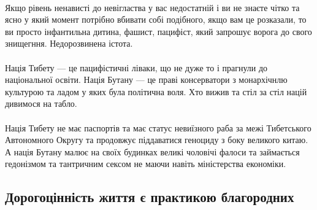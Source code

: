 \\
Якщо рівень ненависті до невігластва у вас недостатній і ви не знаєте чітко та ясно
у який момент потрібно вбивати собі подібного, якщо вам це розказали, то ви просто
інфантильна дитина, фашист, пацифіст, який запрошує ворога до свого знищегння. Недорозвинена істота.
\\
\\
Нація Тибету --- це пацифістичні ліваки, що не дуже то і прагнули до національної освіти.
Нація Бутану --- це праві консерватори з монархічнлю культурою та ладом у яких була політична воля.
Хто вижив та стіл за стіл націй дивимося на табло.
\\
\\
Нація Тибету не має паспортів та має статус невиїзного раба за межі Тибетського Автономного Округу та
продовжує піддаватися геноциду з боку великого китаю. А нація Бутану малює на своїх будинках
великі чоловічі фалоси та займається гедонізмом та тантричним сексом не маючи навіть міністерства економіки.

\subsection{Дорогоцінність життя є практикою благородних}

